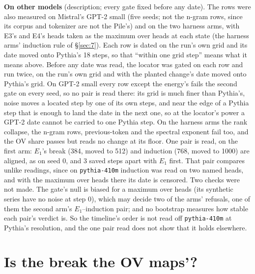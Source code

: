 \documentclass[11pt]{article}
\begin{document}
\textbf{On other models} (description; every gate fixed before any date). The rows were also measured on Mistral's GPT-2 small (five seeds; not the n-gram rows, since its corpus and tokenizer are not the Pile's) and on the two harness arms, with E3's and E4's heads taken as the maximum over heads at each state (the harness arms' induction rule of \S\ref{sec:7}). Each row is dated on the run's own grid and its date moved onto Pythia's 18 steps, so that ``within one grid step'' means what it means above. Before any date was read, the locator was gated on each row and run twice, on the run's own grid and with the planted change's date moved onto Pythia's grid. On GPT-2 small every row except the energy's fails the second gate on every seed, so no pair is read there: its grid is much finer than Pythia's, noise moves a located step by one of its own steps, and near the edge of a Pythia step that is enough to land the date in the next one, so at the locator's power a GPT-2 date cannot be carried to one Pythia step. On the harness arms the rank collapse, the n-gram rows, previous-token and the spectral exponent fail too, and the OV share passes but reads no change at its floor. One pair is read, on the first arm: $E_{1}$'s break (384, moved to 512) and induction (768, moved to 1000) are aligned, as on seed 0, and 3 saved steps apart with $E_{1}$ first. That pair compares unlike readings, since on \texttt{pythia-410m} induction was read on two named heads, and with the maximum over heads there its date is censored. Two checks were not made. The gate's null is biased for a maximum over heads (its synthetic series have no noise at step 0), which may decide two of the arms' refusals, one of them the second arm's $E_{1}$--induction pair; and no bootstrap measures how stable each pair's verdict is. So the timeline's order is not read off \texttt{pythia-410m} at Pythia's resolution, and the one pair read does not show that it holds elsewhere.

\section{Is the break the OV maps'?}\label{sec:6}
\end{document}
